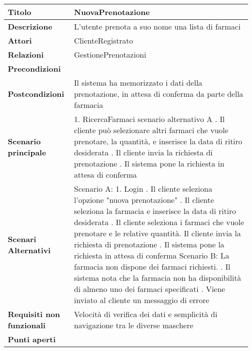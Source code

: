 \begin{tabular} {|P{4.5cm}|P{12.5cm}|}
\hline
  \textbf{Titolo} & NuovaPrenotazione\\
\hline
  \textbf{Descrizione} & L'utente prenota a suo nome una lista di farmaci\\
\hline
  \textbf{Attori} & ClienteRegistrato\\
\hline
  \textbf{Relazioni} & GestionePrenotazioni\\
\hline
  \textbf{Precondizioni} &\\
\hline
  \textbf{Postcondizioni} & Il sistema ha memorizzato i dati della prenotazione, in attesa di conferma da parte della farmacia\\
\hline
  \textbf{Scenario principale} &
    1. RicercaFarmaci scenario alternativo A . Il cliente può
    selezionare altri farmaci che vuole prenotare, la quantità, e inserisce la
    data di ritiro desiderata . Il cliente invia la richiesta di
    prenotazione . Il sistema pone la richiesta in attesa di
    conferma \\
\hline
  \textbf{Scenari Alternativi} & 
    Scenario A:
      1. Login . Il cliente seleziona l'opzione "nuova prenotazione" . Il cliente seleziona la farmacia e inserisce la data di ritiro desiderata . Il cliente seleziona i farmaci che vuole prenotare e le relative quantità. Il cliente invia la richiesta di prenotazione . Il sistema pone la richiesta in attesa di conferma\linebreak
    Scenario B: La farmacia non dispone dei farmaci richiesti. . Il sistema nota che la farmacia non ha disponibilità di almeno uno dei farmaci specificati . Viene inviato al cliente un messaggio di errore\\
\hline
  \textbf{Requisiti non funzionali} & Velocità di verifica dei dati e semplicità di navigazione tra le diverse maschere\\
\hline
  \textbf{Punti aperti} &\\
\hline
\end{tabular}
\hfill
\break

